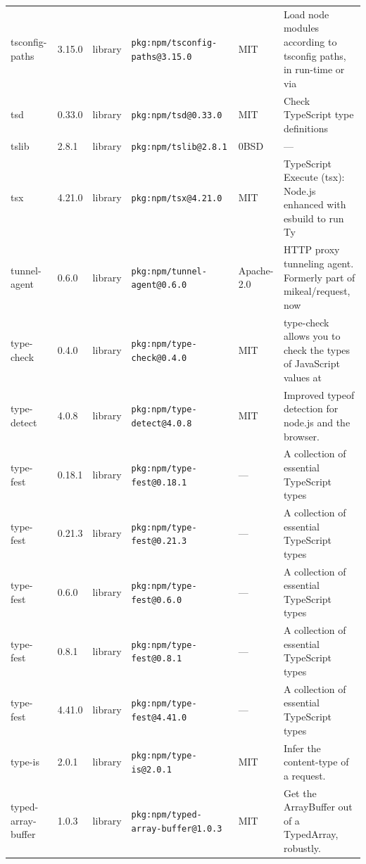 \documentclass[11pt,a4paper]{article}
\begin{document}
\begin{longtable}{|p{4cm}|p{2cm}|p{1.6cm}|p{5cm}|p{1.5cm}|p{3.5cm}|}
\raggedright tsconfig-paths & 3.15.0 & library & \small\texttt{pkg:npm/tsconfig-paths@3.15.0} & MIT & \small Load node modules according to tsconfig paths, in run-time or via \\
\raggedright tsd & 0.33.0 & library & \small\texttt{pkg:npm/tsd@0.33.0} & MIT & \small Check TypeScript type definitions \\
\raggedright tslib & 2.8.1 & library & \small\texttt{pkg:npm/tslib@2.8.1} & 0BSD & \small — \\
\raggedright tsx & 4.21.0 & library & \small\texttt{pkg:npm/tsx@4.21.0} & MIT & \small TypeScript Execute (tsx): Node.js enhanced with esbuild to run Ty \\
\raggedright tunnel-agent & 0.6.0 & library & \small\texttt{pkg:npm/tunnel-agent@0.6.0} & Apache-2.0 & \small HTTP proxy tunneling agent. Formerly part of mikeal/request, now  \\
\raggedright type-check & 0.4.0 & library & \small\texttt{pkg:npm/type-check@0.4.0} & MIT & \small type-check allows you to check the types of JavaScript values at  \\
\raggedright type-detect & 4.0.8 & library & \small\texttt{pkg:npm/type-detect@4.0.8} & MIT & \small Improved typeof detection for node.js and the browser. \\
\raggedright type-fest & 0.18.1 & library & \small\texttt{pkg:npm/type-fest@0.18.1} & — & \small A collection of essential TypeScript types \\
\raggedright type-fest & 0.21.3 & library & \small\texttt{pkg:npm/type-fest@0.21.3} & — & \small A collection of essential TypeScript types \\
\raggedright type-fest & 0.6.0 & library & \small\texttt{pkg:npm/type-fest@0.6.0} & — & \small A collection of essential TypeScript types \\
\raggedright type-fest & 0.8.1 & library & \small\texttt{pkg:npm/type-fest@0.8.1} & — & \small A collection of essential TypeScript types \\
\raggedright type-fest & 4.41.0 & library & \small\texttt{pkg:npm/type-fest@4.41.0} & — & \small A collection of essential TypeScript types \\
\raggedright type-is & 2.0.1 & library & \small\texttt{pkg:npm/type-is@2.0.1} & MIT & \small Infer the content-type of a request. \\
\raggedright typed-array-buffer & 1.0.3 & library & \small\texttt{pkg:npm/typed-array-buffer@1.0.3} & MIT & \small Get the ArrayBuffer out of a TypedArray, robustly. \\

\end{longtable}
\end{document}
